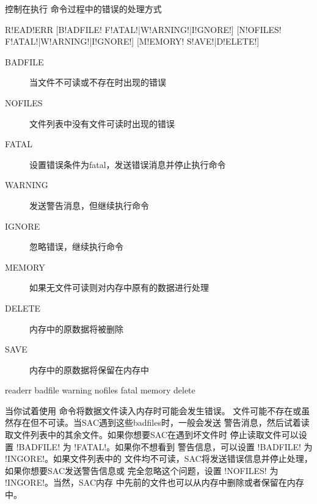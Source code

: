 \label{cmd:readerr}

控制在执行  命令过程中的错误的处理方式

\begin{SACSTX}
R!EAD!ERR [B!ADFILE! F!ATAL!|W!ARNING!|I!GNORE!] [N!OFILES! F!ATAL!|W!ARNING!|I!GNORE!]
          [M!EMORY! S!AVE!|D!ELETE!]
\end{SACSTX}

\begin{description}
\item [BADFILE] 当文件不可读或不存在时出现的错误
\item [NOFILES] 文件列表中没有文件可读时出现的错误
\item [FATAL] 设置错误条件为fatal，发送错误消息并停止执行命令
\item [WARNING] 发送警告消息，但继续执行命令
\item [IGNORE] 忽略错误，继续执行命令
\item [MEMORY] 如果无文件可读则对内存中原有的数据进行处理
\item [DELETE] 内存中的原数据将被删除
\item [SAVE] 内存中的原数据将保留在内存中
\end{description}

\begin{SACDFT}
readerr badfile warning nofiles fatal memory delete
\end{SACDFT}

当你试着使用  命令将数据文件读入内存时可能会发生错误。
文件可能不存在或虽然存在但不可读。当SAC遇到这些badfiles时，一般会发送
警告消息，然后试着读取文件列表中的其余文件。如果你想要SAC在遇到坏文件时
停止读取文件可以设置 !BADFILE! 为 !FATAL!。如果你不想看到
警告信息，可以设置 !BADFILE! 为 !INGORE!。如果文件列表中的
文件均不可读，SAC将发送错误信息并停止处理，如果你想要SAC发送警告信息或
完全忽略这个问题，设置 !NOFILES! 为 !INGORE!。当然，SAC内存
中先前的文件也可以从内存中删除或者保留在内存中。
